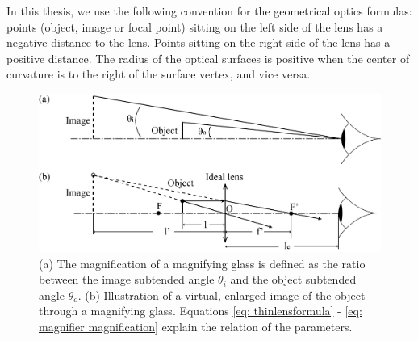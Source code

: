 In this thesis, we use the following convention for the geometrical optics formulas: points (object, image or focal point) sitting on the left side of the lens has a negative distance to the lens. Points sitting on the right side of the lens has a positive distance. The radius of the optical surfaces is positive when the center of curvature is to the right of the surface vertex, and vice versa. 

\begin{figure}
    \centering
    \includegraphics[scale=0.58]{chapter-1/figures/geo_magnifier_v2.png}
    \caption{(a) The magnification of a magnifying glass is defined as the ratio between the image subtended angle $\theta_{i}$ and  the object subtended angle $\theta_{o}$.  
    (b) Illustration of a virtual, enlarged image of the object through a magnifying glass. Equations \ref{eq: thinlensformula} - \ref{eq: magnifier magnification} explain the relation of the parameters.}
    \label{fig: geo_formulae}
\end{figure} 

